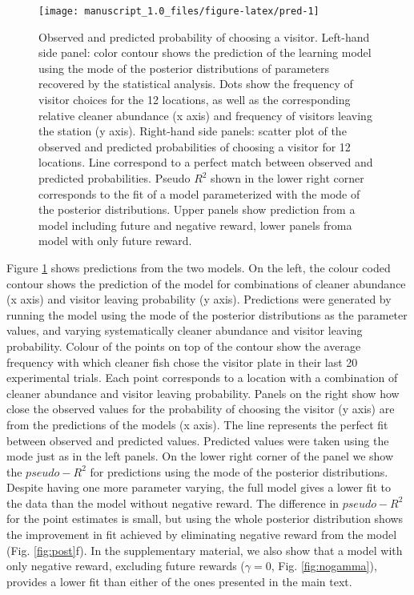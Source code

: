 \documentclass[]{rsos}%
\begin{document}
\begin{figure}

{\centering \texttt{[image: manuscript\_1.0\_files/figure-latex/pred-1]} 

}

\caption{Observed and predicted probability of choosing a visitor. Left-hand side panel: color contour shows the prediction of the learning model using the mode of the posterior distributions of parameters recovered by the statistical analysis. Dots show the frequency of visitor choices for the 12 locations, as well as the corresponding relative cleaner abundance (x axis) and frequency of visitors leaving the station (y axis). Right-hand side panels: scatter plot of the observed and predicted probabilities of choosing a visitor for 12 locations. Line correspond to a perfect match between observed and predicted probabilities. Pseudo $R^2$ shown in the lower right corner corresponds to the fit of a model parameterized with the mode of the posterior distributions. Upper panels show prediction from a model including future and negative reward, lower panels froma  model with only future reward.}\label{fig:pred}
\end{figure}

Figure \ref{fig:pred} shows predictions from the two models. On the
left, the colour coded contour shows the prediction of the model for
combinations of cleaner abundance (x axis) and visitor leaving
probability (y axis). Predictions were generated by running the model
using the mode of the posterior distributions as the parameter values,
and varying systematically cleaner abundance and visitor leaving
probability. Colour of the points on top of the contour show the average
frequency with which cleaner fish chose the visitor plate in their last
20 experimental trials. Each point corresponds to a location with a
combination of cleaner abundance and visitor leaving probability. Panels
on the right show how close the observed values for the probability of
choosing the visitor (y axis) are from the predictions of the models (x
axis). The line represents the perfect fit between observed and
predicted values. Predicted values were taken using the mode just as in
the left panels. On the lower right corner of the panel we show the
\(pseudo-R^2\) for predictions using the mode of the posterior
distributions. Despite having one more parameter varying, the full model
gives a lower fit to the data than the model without negative reward.
The difference in \(pseudo-R^2\) for the point estimates is small, but
using the whole posterior distribution shows the improvement in fit
achieved by eliminating negative reward from the model (Fig.
\ref{fig:post}f). In the supplementary material, we also show that a
model with only negative reward, excluding future rewards (\(\gamma=0\),
Fig. \ref{fig:nogamma}), provides a lower fit than either of the ones
presented in the main text.
\end{document}
